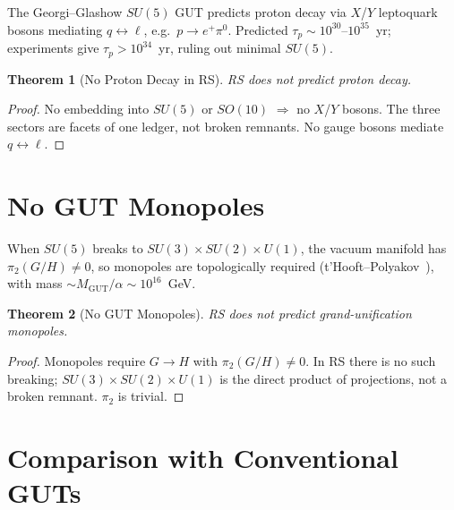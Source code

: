 \documentclass[12pt,a4paper]{article}
\newtheorem{theorem}{Theorem}[section]
\theoremstyle{definition}
\theoremstyle{remark}
\begin{document}
The Georgi--Glashow $SU(5)$ GUT predicts proton decay via $X$/$Y$
leptoquark bosons mediating $q \leftrightarrow \ell$, e.g.\
$p \to e^+ \pi^0$.  Predicted $\tau_p \sim 10^{30}$--$10^{35}$~yr;
experiments give $\tau_p > 10^{34}$~yr, ruling out minimal $SU(5)$.

\begin{theorem}[No Proton Decay in RS]
\label{thm:no-proton-decay}
RS does not predict proton decay.
\end{theorem}

\begin{proof}
No embedding into $SU(5)$ or $SO(10)$ $\Rightarrow$ no $X$/$Y$
bosons.  The three sectors are facets of one ledger, not broken
remnants.  No gauge bosons mediate $q \leftrightarrow \ell$.
\end{proof}

\section{No GUT Monopoles}
\label{sec:monopoles}

When $SU(5)$ breaks to $SU(3) \times SU(2) \times U(1)$, the vacuum
manifold has $\pi_2(G/H) \neq 0$, so monopoles are topologically
required (t'Hooft--Polyakov~\cite{tHooft1974,Polyakov1974}), with
mass $\sim M_{\mathrm{GUT}}/\alpha \sim 10^{16}$~GeV.

\begin{theorem}[No GUT Monopoles]
\label{thm:no-monopoles}
RS does not predict grand-unification monopoles.
\end{theorem}

\begin{proof}
Monopoles require $G \to H$ with $\pi_2(G/H) \neq 0$.  In RS there
is no such breaking; $SU(3) \times SU(2) \times U(1)$ is the direct
product of projections, not a broken remnant.  $\pi_2$ is trivial.
\end{proof}

\section{Comparison with Conventional GUTs}
\label{sec:comparison}
\end{document}
